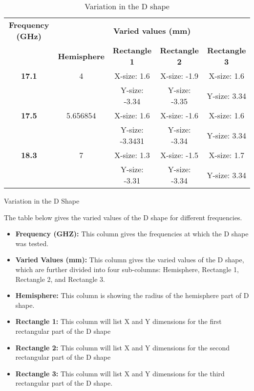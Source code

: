 \documentclass[12pt]{article}
\begin{document}
\begin{table}[h!]
\centering
\renewcommand{\arraystretch}{1.5} %
\setlength{\tabcolsep}{4pt} %
\begin{tabular}{|c|c|c|c|c|}
\hline
\textbf{Frequency (GHz)} & \multicolumn{4}{|c|}{\textbf{Varied values (mm)}} \\ \cline{2-5}
                        & \textbf{Hemisphere} & \textbf{Rectangle 1} & \textbf{Rectangle 2} & \textbf{Rectangle 3} \\ \hline
\textbf{17.1}           & 4                  & X-size: 1.6          & X-size: -1.9         & X-size: 1.6          \\
                        &                    & Y-size: -3.34        & Y-size: -3.35        & Y-size: 3.34         \\ \hline
\textbf{17.5}           & 5.656854           & X-size: 1.6          & X-size: -1.6         & X-size: 1.6          \\
                        &                    & Y-size: -3.3431      & Y-size: -3.34        & Y-size: 3.34         \\ \hline
\textbf{18.3}           & 7                  & X-size: 1.3          & X-size: -1.5         & X-size: 1.7          \\
                        &                    & Y-size: -3.31        & Y-size: -3.34        & Y-size: 3.34         \\ \hline
\end{tabular}
\caption{Variation in the D shape}
\label{tab:variation_dshape}
\end{table}

\par \noindent Variation in the D Shape

The table below gives the varied values of the D shape for different frequencies.

\begin{itemize}
    \item \textbf{Frequency (GHZ):} This column gives the frequencies at which the D shape was tested.
\item \textbf{Varied Values (mm):} This column gives the varied values of the D shape, which are further divided into four sub-columns: Hemisphere, Rectangle 1, Rectangle 2, and Rectangle 3.
\item \textbf{Hemisphere:} This column is showing the radius of the hemisphere part of D shape.
\item \textbf{Rectangle 1:} This column will list X and Y dimensions for the first rectangular part of the D shape
\item \textbf{Rectangle 2:} This column will list X and Y dimensions for the second rectangular part of the D shape
\item \textbf{Rectangle 3:} This column will list X and Y dimensions for the third rectangular part of the D shape.
\end{itemize}
\end{document}
